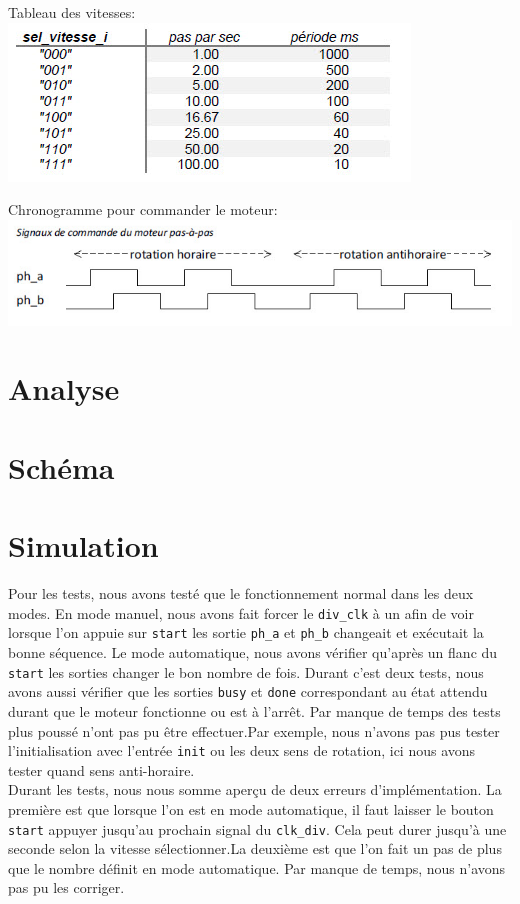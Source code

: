 \documentclass[10pt,a4paper]{article}
\begin{document}
Tableau des vitesses:\\
\includegraphics[scale=0.5]{images/vitesse.jpg}

Chronogramme pour commander le moteur:\\
\includegraphics[scale=0.5]{images/cmd_moteur.jpg}
\newpage
\section{Analyse}

\newpage
\section{Schéma}

\newpage
\section{Simulation}
Pour les tests, nous avons testé que le fonctionnement normal dans les deux modes. En mode manuel, nous avons fait forcer le \texttt{div\_clk} à un afin de voir lorsque l'on appuie sur \texttt{start} les sortie \texttt{ph\_a} et \texttt{ph\_b} changeait et exécutait la bonne séquence. Le mode automatique, nous avons vérifier qu'après un flanc du \texttt{start} les sorties changer le bon nombre de fois. Durant c'est deux tests, nous avons aussi vérifier que les sorties \texttt{busy} et \texttt{done} correspondant au état attendu durant que le moteur fonctionne ou est à l'arrêt. Par manque de temps des tests plus poussé n'ont pas pu être effectuer.Par exemple, nous n'avons pas pus tester l'initialisation avec l'entrée \texttt{init} ou les deux sens de rotation, ici nous avons tester quand sens anti-horaire.\\

Durant les tests, nous nous somme aperçu de deux erreurs d'implémentation. La première est que lorsque l'on est en mode automatique, il faut laisser le bouton \texttt{start} appuyer jusqu'au prochain signal du \texttt{clk\_div}. Cela peut durer jusqu'à une seconde selon la vitesse sélectionner.La deuxième est que l'on fait un pas de plus que le nombre définit en mode automatique. Par manque de temps, nous n'avons pas pu les corriger.
\end{document}
